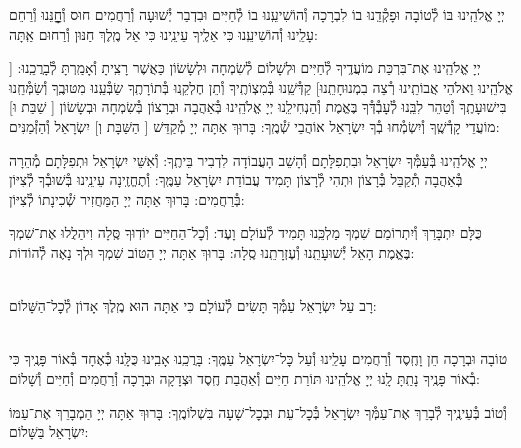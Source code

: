 \documentclass[twoside, openany, parskip=half, 11pt]{book}
\begin{document}
יְיָ אֱלֹהֵֽינוּ בּוֹ לְ֯טוֹבָה וּפָקְ֯דֵֽנוּ בוֹ לִבְרָכָה וְ֯הוֹשִׁיעֵֽנוּ בוֹ לְ֯חַיִּים וּבִדְבַר יְ֯שׁוּעָה וְ֯רַחֲמִים חוּס וְ֯חׇׇׇׇׇׇנֵּנוּ וְ֯רַחֵם עָלֵֽינוּ וְ֯הוֹשִׁיעֵֽנוּ כִּי אֵלֶֽיךָ עֵינֵֽינוּ כִּי אֵל מֶֽלֶךְ חַנּוּן וְ֯רַחוּם אַֽתָּה:

יְיָ אֱלֹהֵֽינוּ אֶת־בִּרְכַּת מוֹעֲדֶֽיךָ לְ֯חַיִּים וּלְשָׁלוֹם לְ֯שִׂמְחָה וּלְשָׂשׂוֹן כַּאֲשֶׁר רָצִֽיתָ וְ֯אָמַֽרְתָּ לְ֯בָרֲכֵֽנוּ: [\shabbos%
אֱלֹהֵֽינוּ וֵאלֹהֵי אֲבוֹתֵֽינוּ רְ֯צֵה בִמְנוּחָתֵֽנוּ] קַדְּ֯שֵֽׁנוּ בְּ֯מִצְוֹתֶֽיךָ וְ֯תֵן חֶלְקֵֽנוּ בְּ֯תוֹרָתֶֽךָ שַׂבְּ֯עֵֽנוּ מִטּוּבֶֽךָ וְ֯שַׂמְּ֯חֵֽנוּ בִּישׁוּעָתֶֽךָ וְ֯טַהֵר לִבֵּֽנוּ לְ֯עָבְ֯דְּ֯ךָ בֶּאֱמֶת וְ֯הַנְחִילֵֽנוּ יְיָ אֱלֹהֵֽינוּ בְּ֯אַהֲבָה וּבְרָצוֹן בְּ֯שִׂמְחָה וּבְשָׂשׂוֹן
[\shabbos%
שַׁבַּת וּ]
מוֹעֲדֵי קָדְ֯שֶֽׁךָ וְ֯יִשְׂמְ֯חוּ בְ֯ךָ יִשְׂרָאֵל אוֹהֲבֵי שְׁ֯מֶֽךָ: בָּרוּךְ אַתָּה יְיָ מְ֯קַדֵּשׁ
[\shabbos%
הַשַּׁבָּת וְ] יִשְׂרָאֵל וְ֯הַזְּ֯מַנִּים:

יְיָ אֱלֹהֵֽינוּ בְּ֯עַמְּ֯ךָ יִשְׂרָאֵל וּבִתְפִלָּתָם וְ֯הָשֵׁב הָעֲבוֹדָה לִדְבִיר בֵּיתֶֽךָ: וְ֯אִשֵּׁי יִשְׂרָאֵל וּתְפִלָּתָם מְ֯הֵרָה בְּ֯אַהֲבָה תְ֯קַבֵּל בְּ֯רָצוֹן וּתְהִי לְ֯רָצוֹן תָּמִיד עֲבוֹדַת יִשְׂרָאֵל עַמֶּֽךָ: וְ֯תֶחֱזֶֽינָה עֵינֵֽינוּ בְּ֯שׁוּבְ֯ךָ לְ֯צִיּוֹן בְּ֯רַחֲמִים: בָּרוּךְ אַתָּה יְיָ הַמַּחֲזִיר שְׁ֯כִינָתוֹ לְ֯צִיּוֹן:

\modim

כֻּלָּם יִתְבָּרַךְ וְ֯יִתְרוֹמַם שִׁמְךָ מַלְכֵּֽנוּ תָּמִיד לְ֯עוֹלָם וָעֶד: וְ֯כׇל־הַחַיִּים יוֹדֽוּךָ סֶּֽלָה וִיהַלֲלוּ אֶת־שִׁמְךָ בֶּאֱמֶת הָאֵל יְ֯שׁוּעָתֵֽנוּ וְ֯עֶזְרָתֵֽנוּ סֶֽלָה: בָּרוּךְ אַתָּה יְיָ הַטּוֹב שִׁמְךָ וּלְךָ נָאֶה לְ֯הוֹדוֹת:







\begin{paracol}{2}

\\
רָב עַל יִשְׂרָאֵל עַמְּ֯ךָ תָּשִׂים לְ֯עוֹלָם כִּי אַתָּה הוּא מֶֽלֶךְ אָדוֹן לְ֯כׇל־הַשָּׁלוֹם:

\switchcolumn


\begin{small}
\\
טוֹבָה וּבְרָכָה חֵן וָחֶֽסֶד וְ֯רַחֲמִים עָלֵֽינוּ וְ֯עַל כׇּל־יִשְׂרָאֵל עַמֶּֽךָ: בָּרֲכֵֽנוּ אָבִֽינוּ כֻּלָּֽנוּ כְּ֯אֶחָד בְּ֯אוֹר פָּנֶֽיךָ כִּי בְ֯אוֹר פָּנֶֽיךָ נָתַֽתָּ לָֽנוּ יְיָ אֱלֹהֵֽינוּ תּוֹרַת חַיִּים וְ֯אַהֲבַת חֶֽסֶד וּצְדָקָה וּבְרָכָה וְ֯רַחֲמִים וְ֯חַיִּים וְ֯שָׁלוֹם:

\end{small}


\end{paracol}
וְ֯טוֹב בְּ֯עֵינֶֽיךָ לְ֯בָרֵךְ אֶת־עַמְּ֯ךָ יִשְׂרָאֵל בְּ֯כׇל־עֵת וּבְכׇל־שָׁעָה בִּשְׁלוֹמֶֽךָ: בָּרוּךְ אַתָּה יְיָ הַמְבָרֵךְ אֶת־עַמּוֹ יִשְׂרָאֵל בַּשָּׁלוֹם:
\end{document}
